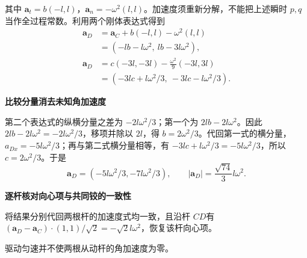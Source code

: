 \begin{solution}
其中 $\bm a_t=b(-l,l)$，$\bm a_n=-\omega^2(l,l)$。加速度须重新分解，不能把上述瞬时 $p,q$当作全过程常数。利用两个刚体表达式得到
\begin{align*}
\bm a_D&=\bm a_C+b(-l,l)-\omega^2(l,l)\\
 &=(-lb-l\omega^2,\ lb-3l\omega^2),\\
\bm a_D&=c(-3l,-3l)-\frac{\omega^2}{9}(-3l,3l)\\
 &=(-3lc+l\omega^2/3,\ -3lc-l\omega^2/3).
\end{align*}


\par\medskip{}\noindent\textbf{比较分量消去未知角加速度}\par\nobreak
第二个表达式的纵横分量之差为 $-2l\omega^2/3$；第一个为 $2lb-2l\omega^2$。因此 $2lb-2l\omega^2=-2l\omega^2/3$，移项并除以 $2l$，得 $b=2\omega^2/3$。代回第一式的横分量，$a_{Dx}=-5l\omega^2/3$；再与第二式横分量相等，有 $-3lc+l\omega^2/3=-5l\omega^2/3$，所以 $c=2\omega^2/3$。于是
\[\boxed{\bm a_D=(-5l\omega^2/3,-7l\omega^2/3)},\qquad
|\bm a_D|=\frac{\sqrt{74}}3l\omega^2.
\]


\par\medskip{}\noindent\textbf{逐杆核对向心项与共同铰的一致性}\par\nobreak
将结果分别代回两根杆的加速度式均一致，且沿杆 $CD$有 $(\bm a_D-\bm a_C)\cdot(1,1)/\sqrt2=-\sqrt2l\omega^2$，恢复该杆向心项。

驱动匀速并不使两根从动杆的角加速度为零。\end{solution}

